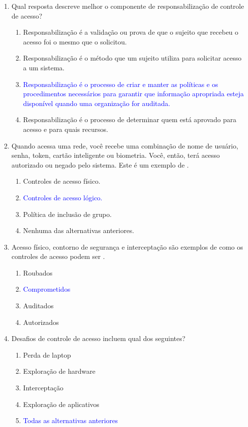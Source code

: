\documentclass{report}
\begin{document}
\begin{enumerate}
		\item Qual resposta descreve melhor o componente de responsabilização de controle de acesso?
		\begin{enumerate}[label=(\alph*)]
			\item Responsabilização é a validação ou prova de que o sujeito que recebeu o acesso foi o mesmo que o solicitou.
			\item Responsabilização é o método que um sujeito utiliza para solicitar acesso a um sistema.
			\item \textcolor{blue}{Responsabilização é o processo de criar e manter as políticas e os procedimentos necessários para garantir que informação apropriada esteja disponível quando uma organização for auditada.}
			\item Responsabilização é o processo de determinar quem está aprovado para acesso e para quais recursos.
		\end{enumerate}
		
		\item Quando acessa uma rede, você recebe uma combinação de nome de usuário, senha, token, cartão inteligente ou biometria. Você, então, terá acesso autorizado ou negado pelo sistema. Este é um exemplo de .
		\begin{enumerate}[label=(\alph*)]
			\item Controles de acesso físico.
			\item \textcolor{blue}{Controles de acesso lógico.}
			\item Política de inclusão de grupo.
			\item Nenhuma das alternativas anteriores.
		\end{enumerate}
		
		\item Acesso físico, contorno de segurança e interceptação são exemplos de como os controles de acesso podem ser .
		\begin{enumerate}[label=(\alph*)]
			\item Roubados
			\item \textcolor{blue}{Comprometidos}
			\item Auditados
			\item Autorizados
		\end{enumerate}
		
		\item Desafios de controle de acesso incluem qual dos seguintes?
		\begin{enumerate}[label=(\alph*)]
			\item Perda de laptop
			\item Exploração de hardware
			\item Interceptação
			\item Exploração de aplicativos
			\item \textcolor{blue}{Todas as alternativas anteriores}
		\end{enumerate}
		

\end{enumerate}
\end{document}
